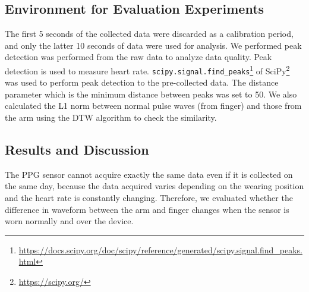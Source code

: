\documentclass[sigconf]{acmart}
\begin{document}
\subsection{Environment for Evaluation Experiments}
The first 5 seconds of the collected data were discarded as a calibration period, and only the latter 10 seconds of data were used for analysis. We performed peak detection was performed from the raw data to analyze data quality. Peak detection is used to measure heart rate. \texttt{scipy.signal.find\_peaks}\footnote{\url{https://docs.scipy.org/doc/scipy/reference/generated/scipy.signal.find_peaks.html}} of SciPy\footnote{\url{https://scipy.org/}} was used to perform peak detection to the pre-collected data. The distance parameter which is the minimum distance between peaks was set to 50. We also calculated the L1 norm between normal pulse waves (from finger) and those from the arm using the DTW algorithm to check the similarity.


\subsection{Results and Discussion}
The PPG sensor cannot acquire exactly the same data even if it is collected on the same day, because the data acquired varies depending on the wearing position and the heart rate is constantly changing. Therefore, we evaluated whether the difference in waveform between the arm and finger changes when the sensor is worn normally and over the device.\par
\end{document}
